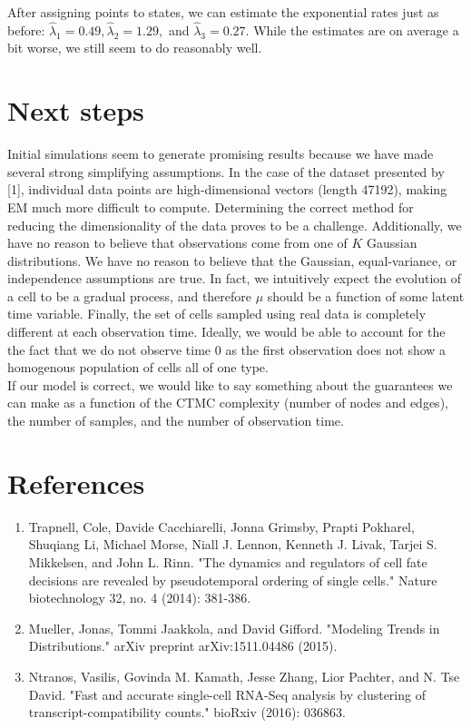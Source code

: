 \documentclass[11pt,onecolumn]{article}
\begin{document}
After assigning points to states, we can estimate the exponential rates just as before: $\hat{\lambda}_1 = 0.49, \hat{\lambda}_2 = 1.29,$ and $\hat{\lambda}_3 = 0.27$. While the estimates are on average a bit worse, we still seem to do reasonably well.

\section{Next steps}
Initial simulations seem to generate promising results because we have made several strong simplifying assumptions. In the case of the dataset presented by [1], individual data points are high-dimensional vectors (length 47192), making EM much more difficult to compute. Determining the correct method for reducing the dimensionality of the data proves to be a challenge. Additionally, we have no reason to believe that observations come from one of $K$ Gaussian distributions. We have no reason to believe that the Gaussian, equal-variance, or independence assumptions are true. In fact, we intuitively expect the evolution of a cell to be a gradual process, and therefore $\mu$ should be a function of some latent time variable. Finally, the set of cells sampled using real data is completely different at each observation time. Ideally, we would be able to account for the the fact that we do not observe time 0 as the first observation does not show a homogenous population of cells all of one type. \\

If our model is correct, we would like to say something about the guarantees we can make as a function of the CTMC complexity (number of nodes and edges), the number of samples, and the number of observation time.

\section{References}
\begin{enumerate}
	\item Trapnell, Cole, Davide Cacchiarelli, Jonna Grimsby, Prapti Pokharel, Shuqiang Li, Michael Morse, Niall J. Lennon, Kenneth J. Livak, Tarjei S. Mikkelsen, and John L. Rinn. "The dynamics and regulators of cell fate decisions are revealed by pseudotemporal ordering of single cells." Nature biotechnology 32, no. 4 (2014): 381-386.
	\item Mueller, Jonas, Tommi Jaakkola, and David Gifford. "Modeling Trends in Distributions." arXiv preprint arXiv:1511.04486 (2015).
	\item Ntranos, Vasilis, Govinda M. Kamath, Jesse Zhang, Lior Pachter, and N. Tse David. "Fast and accurate single-cell RNA-Seq analysis by clustering of transcript-compatibility counts." bioRxiv (2016): 036863.
\end{enumerate}
\end{document}
